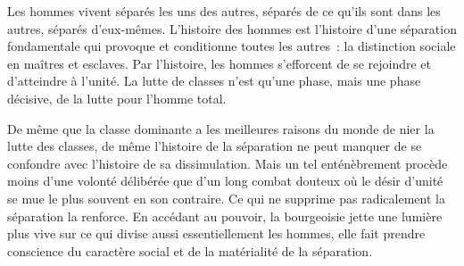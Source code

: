\documentclass[french,twoside]{book} %
\newcommand{\astermono}{\medskip\centerline{\color{rubric}\large\selectfont{\syms ✻}}\medskip\par}%
\begin{document}
\noindent Les hommes vivent séparés les uns des autres, séparés de ce qu’ils sont dans les autres, séparés d’eux-mêmes. L’histoire des hommes est l’histoire d’une séparation fondamentale qui provoque et conditionne toutes les autres : la distinction sociale en maîtres et esclaves. Par l’histoire, les hommes s’efforcent de se rejoindre et d’atteindre à l’unité. La lutte de classes n’est qu’une phase, mais une phase décisive, de la lutte pour l’homme total.\par
De même que la classe dominante a les meilleures raisons du monde de nier la lutte des classes, de même l’histoire de la séparation ne peut manquer de se confondre avec l’histoire de sa dissimulation. Mais un tel enténèbrement procède moins d’une volonté délibérée que d’un long combat douteux où le désir d’unité se mue le plus souvent en son contraire. Ce qui ne supprime pas radicalement la séparation la renforce. En accédant au pouvoir, la bourgeoisie jette une lumière plus vive sur ce qui divise aussi essentiellement les hommes, elle fait prendre conscience du caractère social et de la matérialité de la séparation.\par

\astermono
\end{document}
